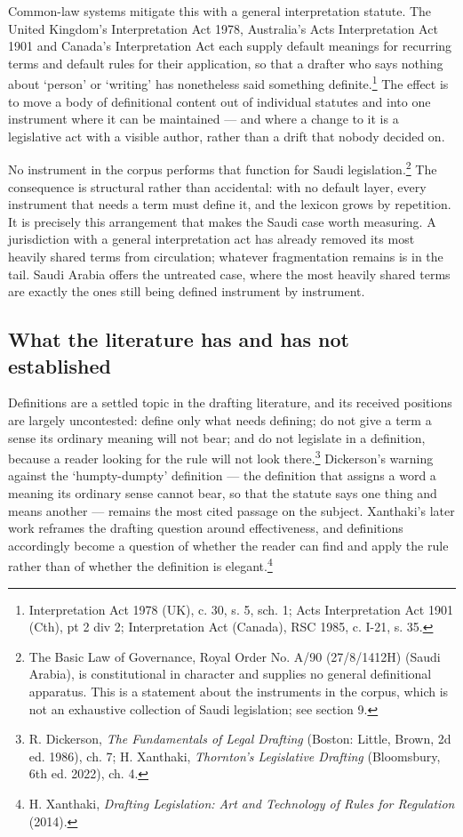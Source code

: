 \documentclass[11pt]{article}
\begin{document}
Common-law systems mitigate this with a general interpretation statute. The
United Kingdom's Interpretation Act 1978, Australia's Acts Interpretation Act
1901 and Canada's Interpretation Act each supply default meanings for
recurring terms and default rules for their application, so that a drafter
who says nothing about `person' or `writing' has nonetheless said something
definite.\footnote{Interpretation Act 1978 (UK), c. 30, s. 5, sch. 1; Acts Interpretation Act 1901 (Cth), pt 2 div 2; Interpretation Act (Canada), RSC 1985, c. I-21, s. 35.} The effect is to move a body of definitional content out of
individual statutes and into one instrument where it can be maintained --- and
where a change to it is a legislative act with a visible author, rather than
a drift that nobody decided on.

No instrument in the corpus performs that function for Saudi
legislation.\footnote{The Basic Law of Governance, Royal Order No. A/90 (27/8/1412H) (Saudi Arabia), is constitutional in character and supplies no general
definitional apparatus. This is a statement about the \nInstruments{} instruments in the
corpus, which is not an exhaustive collection of Saudi legislation; see
section 9.} The consequence is structural rather than accidental: with no
default layer, every instrument that needs a term must define it, and the
lexicon grows by repetition. It is precisely this arrangement that makes the
Saudi case worth measuring. A jurisdiction with a general interpretation act
has already removed its most heavily shared terms from circulation; whatever
fragmentation remains is in the tail. Saudi Arabia offers the untreated case,
where the most heavily shared terms are exactly the ones still being defined
instrument by instrument.

\subsection{What the literature has and has not established}
\label{sec:lit}

Definitions are a settled topic in the drafting literature, and its received
positions are largely uncontested: define only what needs defining; do not
give a term a sense its ordinary meaning will not bear; and do not legislate
in a definition, because a reader looking for the rule will not look
there.\footnote{R. Dickerson, \emph{The Fundamentals of Legal Drafting} (Boston: Little, Brown, 2d ed. 1986), ch. 7; H. Xanthaki, \emph{Thornton's Legislative Drafting} (Bloomsbury, 6th ed. 2022), ch. 4.}
Dickerson's warning against the `humpty-dumpty' definition --- the definition
that assigns a word a meaning its ordinary sense cannot bear, so that the
statute says one thing and means another --- remains the most cited passage
on the subject. Xanthaki's later work reframes the drafting question around
effectiveness, and definitions accordingly become a question of whether the
reader can find and apply the rule rather than of whether the definition is
elegant.\footnote{H. Xanthaki, \emph{Drafting Legislation: Art and Technology of Rules for Regulation} (2014).}
\end{document}
